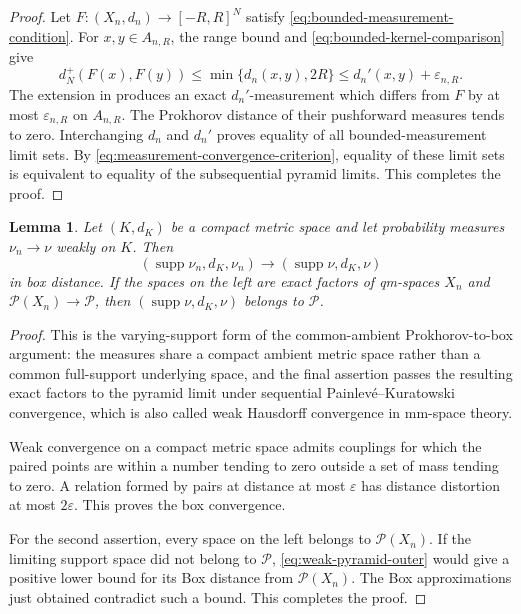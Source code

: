 \documentclass{amsart}
\numberwithin{equation}{section}
\theoremstyle{plain}
\newtheorem{lemma}[theorem]{Lemma}
\theoremstyle{definition}
\theoremstyle{remark}
\newcommand{\Pyr}{\mathcal P}
\DeclareMathOperator{\supp}{supp}
\newcommand{\eps}{\varepsilon}
\begin{document}
\begin{proof}
Let $F\colon(X_n,d_n)\to[-R,R]^N$ satisfy \eqref{eq:bounded-measurement-condition}.  For $x,y\in A_{n,R}$, the range bound and \eqref{eq:bounded-kernel-comparison} give
\[ d_N^+(F(x),F(y)) \le\min\{d_n(x,y),2R\} \le d_n'(x,y)+\eps_{n,R}. \]
The extension in  produces an exact $d_n'$-measurement which differs from $F$ by at most $\eps_{n,R}$ on $A_{n,R}$.  The Prokhorov distance of their pushforward measures tends to zero.  Interchanging $d_n$ and $d_n'$ proves equality of all bounded-measurement limit sets.
By \eqref{eq:measurement-convergence-criterion}, equality of these limit sets is equivalent to equality of the subsequential pyramid limits.
	This completes the proof.
\end{proof}

\begin{lemma}\label{lem:common-ambient-box}
Let $(K,d_K)$ be a compact metric space and let probability measures $\nu_n\longrightarrow\nu$ weakly on $K$.  Then
\[ (\supp\nu_n,d_K,\nu_n) \longrightarrow(\supp\nu,d_K,\nu) \]
in box distance.  If the spaces on the left are exact factors of qm-spaces $X_n$ and $\Pyr(X_n)\to\mathcal P$, then $(\supp\nu,d_K,\nu)$ belongs to $\mathcal P$.
\end{lemma}

\begin{proof}
This is the varying-support form of the common-ambient Prokhorov-to-box argument: the measures share a compact ambient metric space rather than a common full-support underlying space, and the final assertion passes the resulting exact factors to the pyramid limit under sequential Painlev\'e--Kuratowski convergence, which is also called weak Hausdorff convergence in mm-space theory.

Weak convergence on a compact metric space admits couplings for which the paired points are within a number tending to zero outside a set of mass tending to zero.  A relation formed by pairs at distance at most $\eps$ has distance distortion at most $2\eps$.  This proves the box convergence.

For the second assertion, every space on the left belongs to $\Pyr(X_n)$.  If the limiting support space did not belong to $\mathcal P$, \eqref{eq:weak-pyramid-outer} would give a positive lower bound for its Box distance from $\Pyr(X_n)$.  The Box approximations just obtained contradict such a bound.
	This completes the proof.
\end{proof}
\end{document}
